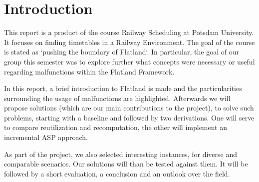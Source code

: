 \section{Introduction}

This report is a product of the course Railway Scheduling at Potsdam University. It focuses on finding timetables in a Railway Environment. The goal of the course is stated as `pushing the boundary of Flatland`. In particular, the goal of our group this semester was to explore further what concepts were necessary or useful regarding malfunctions within the Flatland Framework.

In this report, a brief introduction to Flatland is made and the particularities surrounding the usage of malfunctions are highlighted. Afterwards we will propose solutions (which are our main contributions to the project), to solve such problems, starting with a baseline and followed by two derivations. One will serve to compare reutilization and recomputation, the other will implement an incremental ASP approach.

As part of the project, we also selected interesting instances, for diverse and comparable scenarios. Our solutions will than be tested against them. It will be followed by a short evaluation, a conclusion and an outlook over the field.